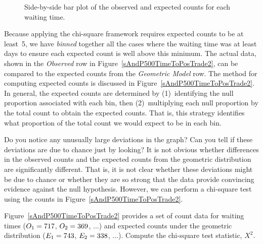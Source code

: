 \begin{figure}
  \centering
  \caption{Side-by-side bar plot of the observed
      and expected counts for each waiting time.}
  \label{geomFitEvaluationForSP500}
\end{figure}

Because applying the chi-square framework requires expected counts
to be at least~5, we have \emph{binned} together all the cases
where the waiting time was at least \spdaysN{} days to ensure each
expected count is well above this minimum.
The actual data, shown in the \emph{Observed} row in
Figure~\ref{sAndP500TimeToPosTrade2}, can be compared to the
expected counts from the \emph{Geometric Model} row.
The method for computing expected counts is discussed in
Figure~\ref{sAndP500TimeToPosTrade2}.
In general, the expected counts are determined by
(1)~identifying the null proportion associated with each bin,
then (2)~multiplying each null proportion by the total count
to obtain the expected counts.
That is, this strategy identifies what proportion of the total
count we would expect to be in each bin.

\begin{examplewrap}
\begin{nexample}{Do you notice any unusually large deviations
    in the graph?
    Can you tell if these deviations are due to chance just
    by looking?}
  It is not obvious whether differences in the observed counts
  and the expected counts from the geometric distribution are
  significantly different.
  That is, it is not clear whether these deviations might be
  due to chance or whether they are so strong that the data
  provide convincing evidence against the null hypothesis.
  However, we can perform a chi-square test using the counts
  in Figure~\ref{sAndP500TimeToPosTrade2}.
\end{nexample}
\end{examplewrap}

\begin{exercisewrap}
\begin{nexercise}
Figure~\ref{sAndP500TimeToPosTrade2}
provides a set of count data for waiting times
($O_1=717{}$, $O_2=369{}$, ...)
and expected counts under the geometric distribution
($E_1=743{}$, $E_2=338{}$, ...).
Compute the chi-square test statistic, $X^2$.\footnotemark
\end{nexercise}
\end{exercisewrap}

